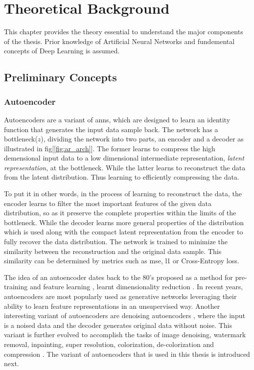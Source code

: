 \chapter{Theoretical Background}
\label{chap:background}

This chapter provides the theory essential to understand the major components of the thesis. Prior knowledge of Artificial Neural Networks \cite{theory_ann_wiki} and fundemental concepts of Deep Learning \cite{theory_dl} is assumed.

\section{Preliminary Concepts}
\label{sec:Preliminary}

\subsection{Autoencoder}
Autoencoders are a variant of \acp{ann}, which are designed to learn an identity function that generates the input data sample back. The network has a bottleneck($z$), dividing the network into two parts, an encoder and a decoder as illustrated in fig[\ref{fig:ar_arch}]. The former learns to compress the high demensional input data to a low dimensional intermediate representation, \textit{latent representation}, at the bottleneck. While the latter learns to reconstruct the data from the latent distribution. Thus learning to efficiently compressing the data. 

To put it in other words, in the process of learning to reconstruct the data, the encoder learns to filter the most important features of the given data distribution, so as it preserve the complete properties within the limits of the bottleneck. While the decoder learns more general properties of the distribution which is used along with the compact latent representation from the encoder to fully recover the data distribution. The network is trained to minimize the similarity between the reconstruction and the original data sample. This similarity can be determined by metrics such as \ac{mse}, \ac{l1} or Cross-Entropy loss. 

The idea of an autoencoder dates back to the 80's proposed as a method for pre-training and feature learning \cite{ballard1987modular, rumelhart1985learning}, learnt dimensionality reduction \cite{hinton_dimentionality}. In recent years, autoencoders are most popularly used as generative networks leveraging their ability to learn feature representations in an unsupervised way. Another interesting variant of autoencoders are denoising autoencoders \cite{vincent2008extracting}, where the input is a noised data and the decoder generates original data without noise. This variant is further evolved to accomplish the tasks of image denoising, watermark removal, inpainting, super resolution, colorization, de-colorization and compression \cite{zhang2016colorful, imagedenoisingpaper}. The variant of autoencoders that is used in this thesis is introduced next.  %

